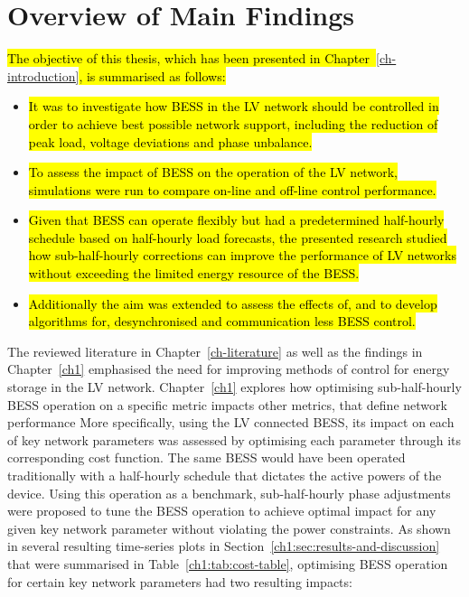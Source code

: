 \section{Overview of Main Findings}
\label{ch-conclusions:sec:main-findings}

\hl{The objective of this thesis, which has been presented in Chapter~}\ref{ch-introduction}\hl{, is summarised as follows:}

\begin{itemize}
	\item
	\hl{It was to investigate how BESS in the LV network should be controlled in order to achieve best possible network support, including the reduction of peak load, voltage deviations and phase unbalance.}
	\item 
	\hl{To assess the impact of BESS on the operation of the LV network, simulations were run to compare on-line and off-line control performance.}
	\item
	\hl{Given that BESS can operate flexibly but had a predetermined half-hourly schedule based on half-hourly load forecasts, the presented research studied how sub-half-hourly corrections can improve the performance of LV networks without exceeding the limited energy resource of the BESS.}
	\item
	\hl{Additionally the aim was extended to assess the effects of, and to develop algorithms for, desynchronised and communication less BESS control.}
\end{itemize}

The reviewed literature in Chapter~\ref{ch-literature} as well as the findings in Chapter~\ref{ch1} emphasised the need for improving methods of control for energy storage in the LV network.
Chapter~\ref{ch1} explores how optimising sub-half-hourly BESS operation on a specific metric impacts other metrics, that define network performance
More specifically, using the LV connected BESS, its impact on each of key network parameters was assessed by optimising each parameter through its corresponding cost function.
The same BESS would have been operated traditionally with a half-hourly schedule that dictates the active powers of the device.
Using this operation as a benchmark, sub-half-hourly phase adjustments were proposed to tune the BESS operation to achieve optimal impact for any given key network parameter without violating the power constraints.
As shown in several resulting time-series plots in Section~\ref{ch1:sec:results-and-discussion} that were summarised in Table~\ref{ch1:tab:cost-table}, optimising BESS operation for certain key network parameters had two resulting impacts:

